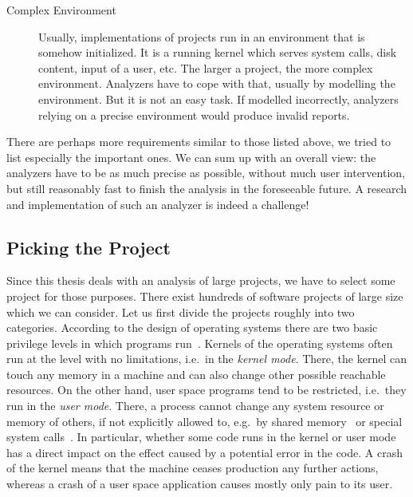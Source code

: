 \begin{description}
\item[Complex Environment] Usually, implementations of projects run in an
environment that is somehow initialized. It is a running kernel which serves
system calls, disk content, input of a user, etc. The larger a project, the
more complex environment. Analyzers have to cope with that, usually by
modelling the environment. But it is not an easy task.  If modelled
incorrectly, analyzers relying on a precise environment would produce invalid
reports.

\end{description}

There are perhaps more requirements similar to those listed above, we tried to
list especially the important ones.  We can sum up with an overall view: the
analyzers have to be as much precise as possible, without much user
intervention, but still reasonably fast to finish the analysis in the
foreseeable future. A research and implementation of such an analyzer is
indeed a challenge!

\subsection{Picking the Project}
Since this thesis deals with an analysis of large projects, we have to select
some project for those purposes.  There exist hundreds of software projects of
large size which we can consider. Let us first divide the projects roughly
into two categories.  According to the design of operating systems there are
two basic privilege levels in which programs run~\cite[pages
21--23]{os_concepts}.  Kernels of the operating systems often run at the level
with no limitations, i.e.\ in the \emph{kernel mode}.  There, the kernel can
touch any memory in a machine and can also change other possible reachable
resources.  On the other hand, user space programs tend to be restricted,
i.e.~they run in the \emph{user mode}. There, a process cannot change any
system resource or memory of others, if not explicitly allowed to, e.g.~by
shared memory~\cite[pages 124--126]{os_concepts} or special system
calls~\cite[pages 62--73]{os_concepts}.  In particular, whether some code runs
in the kernel or user mode has a direct impact on the effect caused by a
potential error in the code. A crash of the kernel means that the machine
ceases production any further actions, whereas a crash of a user space
application causes mostly only pain to its user.

